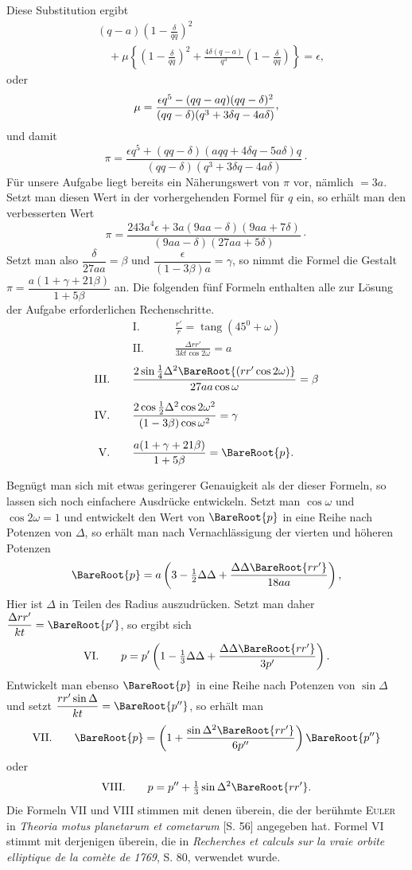 Diese Substitution ergibt
\[
\begin{aligned}
&(q-a)\left(1-\frac{\delta}{qq}\right)^2\\[4pt]
&\quad+\mu\left\{\left(1-\frac{\delta}{qq}\right)^2+\frac{4\delta(q-a)}{q^3}\left(1-\frac{\delta}{qq}\right)\right\}=\epsilon,
\end{aligned}
\]
oder
\[
\mu=\frac{\epsilon q^5-(qq-aq)(qq-\delta)^2}{(qq-\delta)(q^3+3\delta q-4a\delta)}\mathpunct{\raisebox{.45ex}{,}}
\]
und damit
\[
\pi=\frac{\epsilon q^5+(qq-\delta)(aqq+4\delta q-5a\delta)q}{(qq-\delta)(q^3+3\delta q-4a\delta)}\mathpunct{\cdot}
\]
Für unsere Aufgabe liegt bereits ein Näherungswert von $\pi$ vor, nämlich $=3a$. Setzt man diesen Wert in der vorhergehenden Formel für $q$ ein, so erhält man den verbesserten Wert
\[
\pi=\frac{243a^4\epsilon+3a(9aa-\delta)(9aa+7\delta)}{(9aa-\delta)(27aa+5\delta)}\mathpunct{\cdot}
\]
Setzt man also $\dfrac{\delta}{27aa}=\beta$ und $\dfrac{\epsilon}{(1-3\beta)a}=\gamma$, so nimmt die Formel die Gestalt $\pi=\dfrac{a(1+\gamma+21\beta)}{1+5\beta}$ an. Die folgenden fünf Formeln enthalten alle zur Lösung der Aufgabe erforderlichen Rechenschritte.
\[
\begin{aligned}
\mathrm{I.}\qquad&\frac{r'}{r}=\operatorname{tang}(45^0+\omega)\\[6pt]
\mathrm{II.}\qquad&\frac{\Delta rr'}{3kt\cos2\omega}=a
\end{aligned}
\]
\[
\begin{aligned}
\mathrm{III.}\qquad&\frac{2\sin\tfrac14\Delta^2\BareRoot{(rr'\cos2\omega)}}{27aa\cos\omega}=\beta\\[6pt]
\mathrm{IV.}\qquad&\frac{2\cos\tfrac12\Delta^2\cos2\omega^2}{(1-3\beta)\cos\omega^2}=\gamma\\[6pt]
\mathrm{V.}\qquad&\frac{a(1+\gamma+21\beta)}{1+5\beta}=\BareRoot{p}.
\end{aligned}
\]

Begnügt man sich mit etwas geringerer Genauigkeit als der dieser Formeln, so lassen sich noch einfachere Ausdrücke entwickeln. Setzt man $\cos\omega$ und $\cos2\omega=1$ und entwickelt den Wert von $\BareRoot{p}$ in eine Reihe nach Potenzen von $\Delta$, so erhält man nach Vernachlässigung der vierten und höheren Potenzen
\[
\BareRoot{p}=a\left(3-\tfrac12\Delta\Delta+\frac{\Delta\Delta\BareRoot{rr'}}{18aa}\right),
\]
Hier ist $\Delta$ in Teilen des Radius auszudrücken. Setzt man daher $\dfrac{\Delta rr'}{kt}=\BareRoot{p'}$, so ergibt sich
\[
\mathrm{VI.}\qquad p=p'\left(1-\tfrac13\Delta\Delta+\frac{\Delta\Delta\BareRoot{rr'}}{3p'}\right).
\]
Entwickelt man ebenso $\BareRoot{p}$ in eine Reihe nach Potenzen von $\sin\Delta$ und setzt $\dfrac{rr'\sin\Delta}{kt}=\BareRoot{p''}$, so erhält man
\[
\mathrm{VII.}\qquad\BareRoot{p}=\left(1+\frac{\sin\Delta^2\BareRoot{rr'}}{6p''}\right)\BareRoot{p''}
\]
oder
\[
\mathrm{VIII.}\qquad p=p''+\tfrac13\sin\Delta^2\BareRoot{rr'}.
\]
Die Formeln VII und VIII stimmen mit denen überein, die der berühmte \textsc{Euler} in \textit{Theoria motus planetarum et cometarum} [S. 56] angegeben hat. Formel VI stimmt mit derjenigen überein, die in \textit{Recherches et calculs sur la vraie orbite elliptique de la comète de 1769}, S. 80, verwendet wurde.

